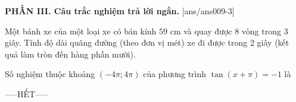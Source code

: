 \documentclass[12pt,a4paper]{article}
\begin{document}
{\bf PHẦN III. Câu trắc nghiệm trả lời ngắn.}
\setcounter{ex}{0}
[ans/ans009-3]
\begin{ex}
 Một bánh xe của một loại xe có bán kính ${59}$ cm và quay được 8 vòng trong 3 giây. Tính độ dài quãng đường (theo đơn vị mét) xe đi được trong 2 giây (kết quả làm tròn đến hàng phần mười). 

\end{ex}

\begin{ex}
 Số nghiệm thuộc khoảng $(- 4 \pi;4 \pi)$ của phương trình $\tan \left(x + \pi\right)=-1$ là

\end{ex}


 \begin{center}
-----HẾT-----
\end{center}

\newpage 
\end{document}
